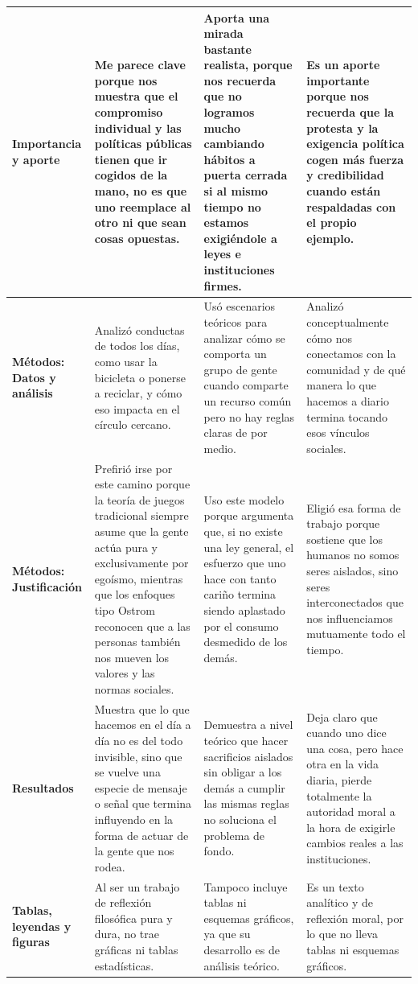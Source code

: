 \documentclass[12pt]{article}
\begin{document}
\begin{longtable}{|>{\raggedright\arraybackslash}p{3cm}|>{\raggedright\arraybackslash}p{4.2cm}|>{\raggedright\arraybackslash}p{4.2cm}|>{\raggedright\arraybackslash}p{4.2cm}|}
\hline
\textbf{Importancia y aporte} & Me parece clave porque nos muestra que el compromiso individual y las políticas públicas tienen que ir cogidos de la mano, no es que uno reemplace al otro ni que sean cosas opuestas. & Aporta una mirada bastante realista, porque nos recuerda que no logramos mucho cambiando hábitos a puerta cerrada si al mismo tiempo no estamos exigiéndole a leyes e instituciones firmes. & Es un aporte importante porque nos recuerda que la protesta y la exigencia política cogen más fuerza y credibilidad cuando están respaldadas con el propio ejemplo. \\
\hline
\textbf{Métodos: Datos y análisis} & Analizó conductas de todos los días, como usar la bicicleta o ponerse a reciclar, y cómo eso impacta en el círculo cercano. & Usó escenarios teóricos para analizar cómo se comporta un grupo de gente cuando comparte un recurso común pero no hay reglas claras de por medio. & Analizó conceptualmente cómo nos conectamos con la comunidad y de qué manera lo que hacemos a diario termina tocando esos vínculos sociales. \\
\hline
\textbf{Métodos: Justificación} & Prefirió irse por este camino porque la teoría de juegos tradicional siempre asume que la gente actúa pura y exclusivamente por egoísmo, mientras que los enfoques tipo Ostrom reconocen que a las personas también nos mueven los valores y las normas sociales. & Uso este modelo porque argumenta que, si no existe una ley general, el esfuerzo que uno hace con tanto cariño termina siendo aplastado por el consumo desmedido de los demás. & Eligió esa forma de trabajo porque sostiene que los humanos no somos seres aislados, sino seres interconectados que nos influenciamos mutuamente todo el tiempo. \\
\hline
\textbf{Resultados} & Muestra que lo que hacemos en el día a día no es del todo invisible, sino que se vuelve una especie de mensaje o señal que termina influyendo en la forma de actuar de la gente que nos rodea. & Demuestra a nivel teórico que hacer sacrificios aislados sin obligar a los demás a cumplir las mismas reglas no soluciona el problema de fondo. & Deja claro que cuando uno dice una cosa, pero hace otra en la vida diaria, pierde totalmente la autoridad moral a la hora de exigirle cambios reales a las instituciones. \\
\hline
\textbf{Tablas, leyendas y figuras} & Al ser un trabajo de reflexión filosófica pura y dura, no trae gráficas ni tablas estadísticas. & Tampoco incluye tablas ni esquemas gráficos, ya que su desarrollo es de análisis teórico. & Es un texto analítico y de reflexión moral, por lo que no lleva tablas ni esquemas gráficos. \\

\end{longtable}
\end{document}
